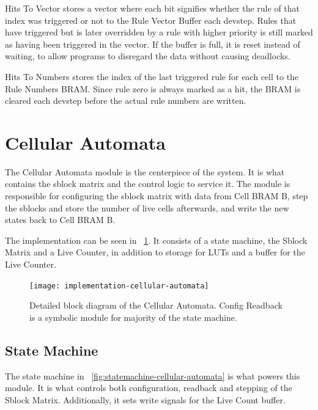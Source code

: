 Hits To Vector stores a vector where each bit signifies whether the rule of that index was triggered or not to the Rule Vector Buffer each devstep.
Rules that have triggered but is later overridden by a rule with higher priority is still marked as having been triggered in the vector.
If the buffer is full, it is reset instead of waiting, to allow programs to disregard the data without causing deadlocks.

Hits To Numbers stores the index of the last triggered rule for each cell to the Rule Numbers BRAM.
Since rule zero is always marked as a hit, the BRAM is cleared each devstep before the actual rule numbers are written.


\section{Cellular Automata}

The Cellular Automata module is the centerpiece of the system.
It is what contains the sblock matrix and the control logic to service it.
The module is responsible for configuring the sblock matrix with data from Cell BRAM B, step the sblocks and store the number of live cells afterwards, and write the new states back to Cell BRAM B.

The implementation can be seen in \figurename~\ref{fig:implementation-cellular-automata}.
It consists of a state machine, the Sblock Matrix and a Live Counter, in addition to storage for LUTs and a buffer for the Live Counter.

\begin{figure}[!ht]
    \centering
    \texttt{[image: implementation-cellular-automata]}
    \caption[Cellular Automata]{
        Detailed block diagram of the Cellular Automata.
        Config Readback is a symbolic module for majority of the state machine.
    }
    \label{fig:implementation-cellular-automata}
\end{figure}

\subsection{State Machine}

The state machine in \figurename~\ref{fig:statemachine-cellular-automata} is what powers this module.
It is what controls both configuration, readback and stepping of the Sblock Matrix.
Additionally, it sets write signals for the Live Count buffer.

